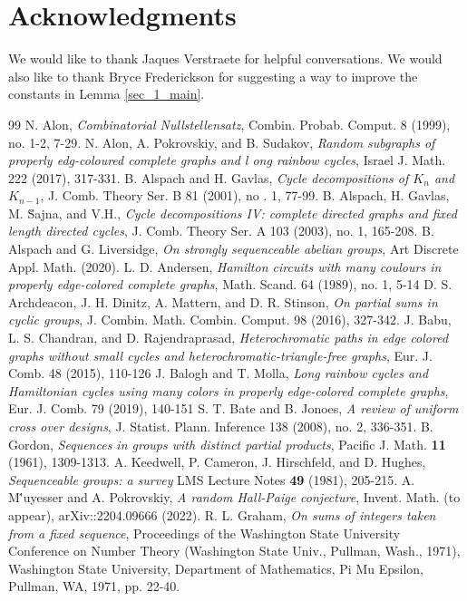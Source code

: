 \documentclass[11pt,a4paper]{article}
\begin{document}
\section{Acknowledgments}
We would like to thank Jaques Verstraete for helpful conversations. We would also like to thank Bryce Frederickson for suggesting a way to improve the constants in Lemma \ref{sec_1_main}.
\begin{thebibliography}{99}
 N. Alon, \textit{Combinatorial Nullstellensatz}, Combin. Probab. Comput. 8 (1999), no. 1-2, 7-29.
 N. Alon, A. Pokrovskiy, and B. Sudakov, \textit{Random subgraphs of properly edg-coloured complete graphs and l ong rainbow cycles}, Israel J. Math. 222 (2017), 317-331.
 B. Alspach and H. Gavlas, \textit{Cycle decompositions of $K_n$ and $K_{n - 1}$}, J. Comb. Theory Ser. B 81 (2001), no . 1, 77-99.
 B. Alspach, H. Gavlas, M. \u Sajna, and V.H., \textit{Cycle decompositions IV: complete directed graphs and fixed length directed cycles}, J. Comb. Theory Ser. A 103 (2003), no. 1, 165-208.
 B. Alspach and G. Liversidge, \textit{On strongly sequenceable abelian groups}, Art Discrete Appl. Math. (2020).
 L. D. Andersen, \textit{Hamilton circuits with many coulours in properly edge-colored complete graphs}, Math. Scand. 64 (1989), no. 1, 5-14
 D. S. Archdeacon, J. H. Dinitz, A. Mattern, and D. R. Stinson, \textit{On partial sums in cyclic groups}, J. Combin. Math. Combin. Comput. 98 (2016), 327-342.
 J. Babu, L. S. Chandran, and D. Rajendraprasad, \textit{Heterochromatic paths in edge colored graphs without small cycles and heterochromatic-triangle-free graphs}, Eur. J. Comb. 48 (2015), 110-126
 J. Balogh and T. Molla, \textit{Long rainbow cycles and Hamiltonian cycles using many colors in properly edge-colored complete graphs}, Eur. J. Comb. 79 (2019), 140-151
 S. T. Bate and B. Jonoes, \textit{A review of uniform cross over designs}, J. Statist. Plann. Inference 138 (2008), no. 2, 336-351.
 B. Gordon, \textit{Sequences in groups with distinct partial products}, Pacific J. Math. \textbf{11} (1961), 1309-1313.
 A. Keedwell, P. Cameron, J. Hirschfeld, and D. Hughes, \textit{Sequenceable groups: a survey} LMS Lecture Notes \textbf{49} (1981), 205-215.
 A. M\''{u}yesser and A. Pokrovskiy, \textit{A random Hall-Paige conjecture}, Invent. Math. (to appear), arXiv::2204.09666 (2022).
 R. L. Graham, \textit{On sums of integers taken from a fixed sequence}, Proceedings of the Washington State University Conference on Number Theory (Washington State Univ., Pullman, Wash., 1971), Washington State University, Department of Mathematics, Pi Mu Epsilon, Pullman, WA, 1971, pp. 22-40.

\end{thebibliography}
\end{document}
